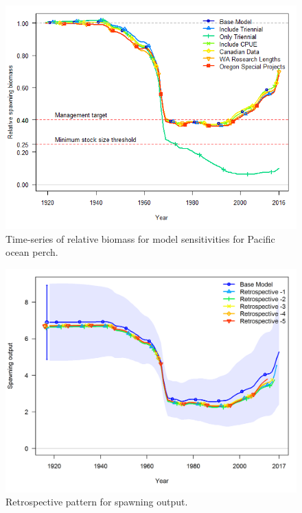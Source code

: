 \documentclass[12pt,]{article}
\begin{document}
\FloatBarrier

\begin{figure}
\centering
\includegraphics{Figures/depl_sens2.png}
\caption{Time-series of relative biomass for model sensitivities for
Pacific ocean perch. \label{fig:sens2_depl}}
\end{figure}

\FloatBarrier

\begin{figure}
\centering
\includegraphics{Figures/compare2_spawnbio_uncertainty.png}
\caption{Retrospective pattern for spawning output.
\label{fig:retro_sb}}
\end{figure}
\end{document}
